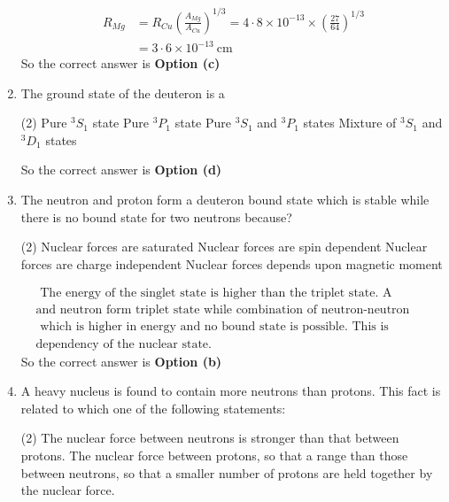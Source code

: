 \begin{enumerate}
\begin{answer}
	$$
	\begin{aligned}
 R_{M g}&=R_{C u}\left(\frac{A_{M g}}{A_{C u}}\right)^{1 / 3}=4 \cdot 8 \times 10^{-13} \times\left(\frac{27}{64}\right)^{1 / 3}\\
	&=3 \cdot 6 \times 10^{-13} \mathrm{~cm}
\end{aligned}
$$
So the correct answer is \textbf{Option (c)}
\end{answer}
	\item The ground state of the deuteron is a
	 \begin{tasks}(2)
		\task[\textbf{a.}]Pure ${ }^3 S_1$ state
		\task[\textbf{b.}]Pure ${ }^3 P_1$ state
		\task[\textbf{c.}] Pure ${ }^3 S_1$ and ${ }^3 P_1$ states
		\task[\textbf{d.}] Mixture of ${ }^3 S_1$ and ${ }^3 D_1$ states
	\end{tasks}
\begin{answer}
So the correct answer is \textbf{Option (d)}
\end{answer}
	\item The neutron and proton form a deuteron bound state which is stable while there is no bound state for two neutrons because?
	 \begin{tasks}(2)
		\task[\textbf{a.}]Nuclear forces are saturated
		\task[\textbf{b.}]Nuclear forces are spin dependent
		\task[\textbf{c.}]Nuclear forces are charge independent
		\task[\textbf{d.}] Nuclear forces depends upon magnetic moment
	\end{tasks}
\begin{answer}
	$$
	\begin{aligned}
	&\text{ The energy of the singlet state is higher than the triplet state. A combination of proton }\\
	&\text{and neutron form triplet state while combination of neutron-neutron forms singlet state,}\\
	&\text{ which is higher in energy and no bound state is possible. This is confirming the spin }\\
	&\text{dependency of the nuclear state.}
\end{aligned}
$$
So the correct answer is \textbf{Option (b)}
\end{answer}
	\item A heavy nucleus is found to contain more neutrons than protons. This fact is related to which one of the following statements:
	 \begin{tasks}(2)
		\task[\textbf{a.}]The nuclear force between neutrons is stronger than that between protons.
		\task[\textbf{b.}]The nuclear force between protons, so that a range than those between neutrons, so that a smaller number of protons are held together by the nuclear force.

\end{tasks}
\end{enumerate}
